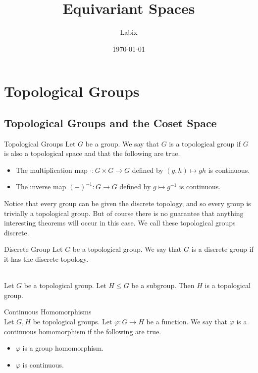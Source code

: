 \documentclass[a4paper]{article}
\title{Equivariant Spaces}
\author{Labix}
\date{\today}
\begin{document}
\maketitle
\begin{abstract}
\end{abstract}

\pagebreak
\tableofcontents
\pagebreak

\pagebreak
\section{Topological Groups}
\subsection{Topological Groups and the Coset Space}
\begin{defn}{Topological Groups}{} Let $G$ be a group. We say that $G$ is a topological group if $G$ is also a topological space and that the following are true. 
\begin{itemize}
\item The multiplication map $\cdot:G\times G\to G$ defined by $(g,h)\mapsto gh$ is continuous. 
\item The inverse map $(-)^{-1}:G\to G$ defined by $g\mapsto g^{-1}$ is continuous. 
\end{itemize}
\end{defn}

Notice that every group can be given the discrete topology, and so every group is trivially a topological group. But of course there is no guarantee that anything interesting theorems will occur in this case. We call these topological groups discrete. 

\begin{defn}{Discrete Group}{} Let $G$ be a topological group. We say that $G$ is a discrete group if it has the discrete topology. 
\end{defn}

\begin{prp}{}{}\\
Let $G$ be a topological group. Let $H\leq G$ be a subgroup. Then $H$ is a topological group. 
\end{prp}

\begin{defn}{Continuous Homomorphisms}{}\\
Let $G,H$ be topological groups. Let $\varphi:G\to H$ be a function. We say that $\varphi$ is a continuous homomorphism if the following are true. 
\begin{itemize}
\item $\varphi$ is a group homomorphism. 
\item $\varphi$ is continuous. 
\end{itemize}
\end{defn}
\end{document}
